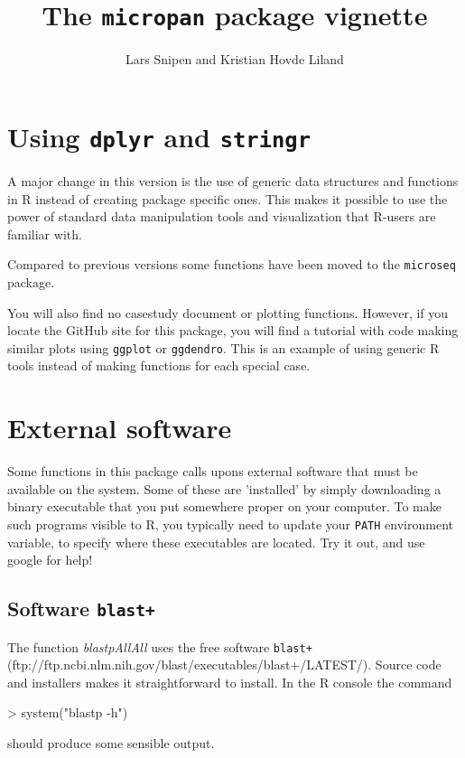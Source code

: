 \documentclass{article}
\title{The \texttt{micropan} package vignette}
\author{Lars Snipen and Kristian Hovde Liland}
\date{}
\begin{document}


\maketitle


\section{Using \texttt{dplyr} and \texttt{stringr}}
A major change in this version is the use of generic data structures and functions in R instead of creating package specific ones. This makes it possible to use the power of standard data manipulation tools and visualization that R-users are familiar with.

Compared to previous versions some functions have been moved to the \texttt{microseq} package.

You will also find no casestudy document or plotting functions. However, if you locate the GitHub site for this package, you will find a tutorial with code making similar plots using \texttt{ggplot} or \texttt{ggdendro}. This is an example of using generic R tools instead of making functions for each special case.



\section{External software}
Some functions in this package calls upons external software that must be available on the system. Some of these are 'installed' by simply downloading a binary executable that you put somewhere proper on your computer. To make such programs visible to R, you typically need to update your \texttt{PATH} environment variable, to specify where these executables are located. Try it out, and use google for help!


\subsection{Software \texttt{blast+}}
The function \emph{blastpAllAll} uses the free software \texttt{blast+} (ftp://ftp.ncbi.nlm.nih.gov/blast/executables/blast+/LATEST/). Source code and installers makes it straightforward to install. In the R console the command
\begin{Schunk}
\begin{Sinput}
> system("blastp -h")
\end{Sinput}
\end{Schunk}
should produce some sensible output.
\end{document}
